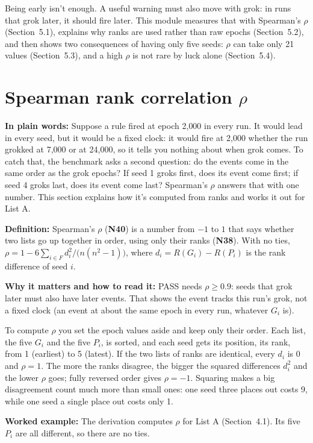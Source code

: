 \documentclass[11pt,a4paper,oneside,openany]{report}
\newcommand{\gl}[1]{\textbf{#1}}   %
\newcommand{\fplain}{\textbf{In plain words:} }
\newcommand{\fdef}{\textbf{Definition:} }
\newcommand{\fread}{\par\textbf{Why it matters and how to read it:} }
\newcommand{\fex}{\par\textbf{Worked example:} }
\begin{document}
Being early isn't enough. A useful warning must also move with grok: in runs that grok later, it should fire later. This module measures that with Spearman's $\rho$ (Section~5.1), explains why ranks are used rather than raw epochs (Section~5.2), and then shows two consequences of having only five seeds: $\rho$ can take only 21 values (Section~5.3), and a high $\rho$ is not rare by luck alone (Section~5.4).

\section{Spearman rank correlation $\rho$}
\fplain Suppose a rule fired at epoch 2{,}000 in every run. It would lead in every seed, but it would be a fixed clock: it would fire at 2{,}000 whether the run grokked at 7{,}000 or at 24{,}000, so it tells you nothing about when grok comes. To catch that, the benchmark asks a second question: do the events come in the same order as the grok epochs? If seed 1 groks first, does its event come first; if seed 4 groks last, does its event come last? Spearman's $\rho$ answers that with one number. This section explains how it's computed from ranks and works it out for List A.

\fdef Spearman's $\rho$ (\gl{N40}) is a number from $-1$ to $1$ that says whether two lists go up together in order, using only their ranks (\gl{N38}). With no ties, $\rho = 1 - 6\sum_{i \in F} d_i^2 / \big(n(n^2-1)\big)$, where $d_i = R(G_i) - R(P_i)$ is the rank difference of seed $i$.
\fread PASS needs $\rho \ge 0.9$: seeds that grok later must also have later events. That shows the event tracks this run's grok, not a fixed clock (an event at about the same epoch in every run, whatever $G_i$ is).

To compute $\rho$ you set the epoch values aside and keep only their order. Each list, the five $G_i$ and the five $P_i$, is sorted, and each seed gets its position, its rank, from 1 (earliest) to 5 (latest). If the two lists of ranks are identical, every $d_i$ is 0 and $\rho = 1$. The more the ranks disagree, the bigger the squared differences $d_i^2$ and the lower $\rho$ goes; fully reversed order gives $\rho = -1$. Squaring makes a big disagreement count much more than small ones: one seed three places out costs 9, while one seed a single place out costs only 1.

\fex The derivation computes $\rho$ for List A (Section~4.1). Its five $P_i$ are all different, so there are no ties.
\end{document}
